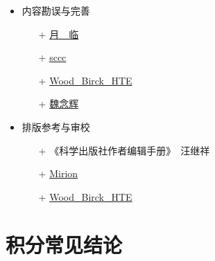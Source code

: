 \documentclass{ctexbook}
\begin{document}
{\begin{itemize}
\begin{itemize}
		\item[+] Geogebra
          	\item[+] Overleaf
		\item[+] \underline{Mirion}
	\end{itemize}
	\item 内容勘误与完善
	\begin{itemize}
		\item[+] \underline{月\ \ 临}
		\item[+] \underline{sccc}
		\item[+] \underline{Wood\_Birck\_HTE}
		\item[+] \underline{魏念辉}
	\end{itemize}
	\item 排版参考与审校
	\begin{itemize}
		\item[+] 《科学出版社作者编辑手册》\ 汪继祥
		\item[+] \underline{Mirion}
		\item[+] \underline{Wood\_Birck\_HTE}
	\end{itemize}
\end{itemize}
\chapter{积分常见结论}
}
\end{document}
